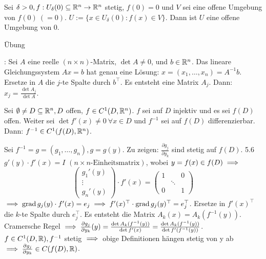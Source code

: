 \documentclass[a4paper,oneside,DIV15,BCOR12mm,chapterprefix=true,headings=onelinechapter]{scrbook}
\begin{document}
\begin{wichtigerhilfssatz}
Sei $\delta>0, f:U_\delta(0)\subseteq\mathbb{R}^n\to\mathbb{R}^n$ stetig, $f(0)=0$ und $V$ sei eine offene Umgebung von $f(0)\ (=0)$. $U:=\{x\in U_\delta(0):f(x)\in V\}$. Dann ist $U$ eine offene Umgebung von $0$.
\end{wichtigerhilfssatz}
\begin{beweis}
Übung
\end{beweis}

\begin{erinnerung}
: Sei $A$ eine reelle $(n\times n)$-Matrix, $\det A\ne 0$, und $b\in\mathbb{R}^n$. Das lineare Gleichungssystem $Ax=b$ hat genau eine Lösung: $x=(x_1,\ldots,x_n)=A^{-1}b$. Ersetze in $A$ die $j$-te Spalte durch $b^\top$. Es entsteht eine Matrix $A_j$. Dann: $x_j=\frac{\det A_j}{\det A}$.
\end{erinnerung}

\begin{satz}
Sei $\emptyset\ne D\subseteq \mathbb{R}^n, D$ offen, $f\in C^1(D,\mathbb{R}^n)$. $f$ sei auf $D$ injektiv und es sei $f(D)$ offen. Weiter sei $\det f'(x)\ne 0\ \forall x\in D$ und $f^{-1}$ sei auf $f(D)$ differenzierbar. Dann: $f^{-1}\in C^1(f(D),\mathbb{R}^n)$.
\end{satz}

\begin{beweis}
Sei $f^{-1}=g=(g_1,\ldots,g_n), g=g(y)$. Zu zeigen: $\frac{\partial g_j}{\partial y_k}$ sind stetig auf $f(D)$. 5.6\folgt $g'(y)\cdot f'(x)=I$ $(n\times n\text{-Einheitsmatrix})$, wobei $y=f(x)\in f(D)\implies$
$$
\begin{pmatrix}
g_1'(y)\\
\vdots\\
g_n'(y)
\end{pmatrix}\cdot f'(x)=
\begin{pmatrix}
1 & & 0 \\
& \ddots &\\
0 & & 1
\end{pmatrix}$$
$\implies \mathop{\rm grad}\nolimits g_j(y)\cdot f'(x)=e_j\implies f'(x)^\top\cdot \mathop{\rm grad}\nolimits g_j(y)^\top=e_j^\top$. Ersetze in $f'(x)^\top$ die $k$-te Spalte durch $e_j^\top$. Es entsteht die Matrix $A_k(x)=A_k(f^{-1}(y))$. Cramersche Regel $\implies \frac{\partial g_j}{\partial y_k}(y)=\frac{\det A_k(f^{-1}(y))}{\det f'(x)}=\frac{\det A_k(f^{-1}(y))}{\det f'(f^{-1}(y))}$. $f\in C^1(D,\mathbb{R}), f^{-1}$ stetig $\implies$ obige Definitionen hängen stetig von y ab $\implies \frac{\partial g_j}{\partial y_k}\in C(f(D),\mathbb{R})$.
\end{beweis}
\end{document}
